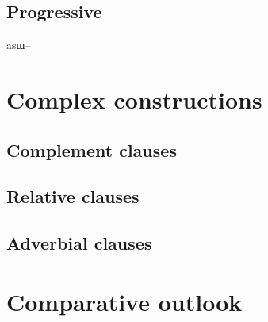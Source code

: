 \documentclass[oldfontcommands,oneside,a4paper,11pt]{article}
\newcommand{\ipa}[1]{{\phon #1}} %
\begin{document}
\subsection{Progressive}
\ipa{asɯ--}


    \section{Complex constructions} 
    
   \subsection{Complement clauses}
   
   \subsection{Relative clauses}    
   
\subsection{Adverbial clauses} \label{sec:adverbial} 
\citet{jacques14linking}

 \citet{jacques15comparative}
 
    \section{Comparative outlook} 




\end{document}
